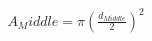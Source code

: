 \documentclass[preview]{standalone}
\begin{document}
\begin{align*}
A_Middle = \pi \left(\frac{d_{Middle}}{2}\right)^2
\end{align*}
\end{document}
